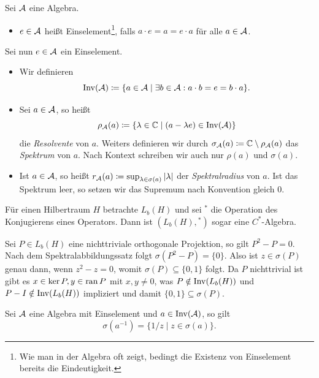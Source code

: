 \begin{definition}
    Sei $\mathcal{A}$ eine Algebra.
    \begin{itemize}
        \item $e \in \mathcal{A}$ heißt Einselement\footnote{Wie man in der Algebra oft zeigt, bedingt die Existenz von Einselement bereits die Eindeutigkeit.}, falls $a \cdot e = a = e \cdot a$ für alle $a \in \mathcal{A}$.
    \end{itemize}
    Sei nun $e \in \mathcal{A}$ ein Einselement.
    \begin{itemize}
        \item Wir definieren
        $$ \operatorname*{Inv}(\mathcal{A}) \coloneqq \{ a \in \mathcal{A} \mid \exists b \in \mathcal{A} : a \cdot b = e = b \cdot a \}. $$
        \item Sei $a \in \mathcal{A}$, so heißt
        $$ \rho_{\mathcal{A}}(a) \coloneqq \{ \lambda \in \mathbb{C} \mid (a - \lambda e) \in \operatorname*{Inv}(\mathcal{A}) \} $$
        die \emph{Resolvente} von $a$. Weiters definieren wir durch $\sigma_{\mathcal{A}}(a) \coloneqq \mathbb{C} \setminus \rho_{\mathcal{A}}(a)$ das \emph{Spektrum} von $a$. Nach Kontext schreiben wir auch nur $\rho(a)$ und $\sigma(a)$.
        \item Ist $a \in \mathcal{A}$, so heißt $r_{\mathcal{A}}(a) \coloneqq \sup_{\lambda \in \sigma(a)} \vert \lambda \vert$ der \emph{Spektralradius} von $a$. Ist das Spektrum leer, so setzen wir das Supremum nach Konvention gleich $0$.
    \end{itemize}
\end{definition}

\begin{example}
    Für einen Hilbertraum $H$ betrachte $L_b(H)$ und sei ${}^*$ die Operation des Konjugierens eines Operators. Dann ist $(L_b(H), {}^*)$ sogar eine $C^*$-Algebra.

    Sei $P \in L_b(H)$ eine nichttriviale orthogonale Projektion, so gilt $P^2 - P = 0$. Nach dem Spektralabbildungssatz folgt $\sigma(P^2 - P) = \{ 0 \}$. Also ist $z \in \sigma(P)$ genau dann, wenn $z^2 - z = 0$, womit $\sigma(P) \subseteq \{ 0, 1 \}$ folgt. Da $P$ nichttrivial ist gibt es $x \in \ker P, y \in \operatorname*{ran} P$ mit $x, y \neq 0$, was $P \notin \operatorname*{Inv}(L_b(H))$ und $P - I \notin \operatorname*{Inv}(L_b(H))$ impliziert und damit $\{ 0, 1 \} \subseteq \sigma(P)$.
\end{example}

\begin{lemma}
    Sei $\mathcal{A}$ eine Algebra mit Einselement und $a \in \operatorname*{Inv}(\mathcal{A})$, so gilt
    $$ \sigma(a^{-1}) = \{ 1/z \mid z \in \sigma(a) \}. $$
\end{lemma}

